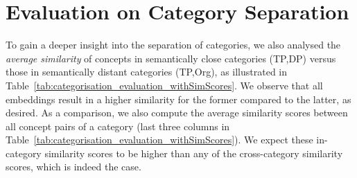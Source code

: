\documentclass[letterpaper]{article} %
\begin{document}
\clearpage
\section{Evaluation on Category Separation}
To gain a deeper insight into the separation of categories, we also analysed the \emph{average similarity} of concepts in semantically close categories (TP,DP) versus those in semantically distant categories (TP,Org), as illustrated in Table~\ref{tab:categorisation_evaluation_withSimScores}. We observe that all embeddings result in a higher similarity for the former compared to the latter, as desired.
As a comparison, we also compute the average similarity scores between all concept pairs of a category (last three columns in Table~\ref{tab:categorisation_evaluation_withSimScores}). We expect these in-category similarity scores to be higher than any of the cross-category similarity scores, which is indeed the case.
\end{document}
